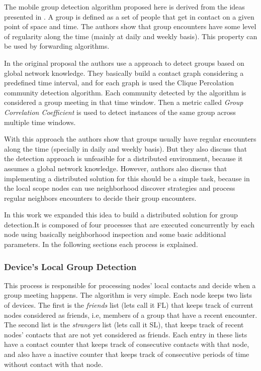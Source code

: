 The mobile group detection algorithm proposed here is derived from the ideas presented in \cite{groupMobility}.
A group is defined as a set of people that get in contact on a given point of space and time. The authors show that
group encounters have some level of regularity along the time (mainly at daily and weekly basis). This property can be used by forwarding algorithms.

In the original proposal the authors use a approach to detect groups based on global network knowledge. They basically
build a contact graph considering a predefined time interval, and for each graph is used the Clique Percolation community
detection algorithm. Each community detected by the algorithm is considered a group meeting in that time window. Then
a metric called \textit{Group Correlation Coefficient} is used to detect instances of the same group across multiple time
windows.

With this approach the authors show that groups usually have regular encounters along the time (specially in daily and weekly basis).
But they also discuss that the detection approach is unfeasible for a distributed environment, because it assumes a global network
knowledge. However, authors also discuss that implementing a distributed solution for this should be a simple task, because in the local
scope nodes can use neighborhood discover strategies and process regular neighbors encounters to decide their group encounters.

In this work we expanded this idea to build a distributed solution for group detection.It is composed of four processes
that are executed concurrently by each node using basically neighborhood inspection and some basic additional parameters. In the following sections each process is explained.

\subsubsection{Device's Local Group Detection}

This process is responsible for processing nodes' local contacts and decide when a group meeting happens.
The algorithm is very simple. Each node keeps two lists of devices. The first is the \textit{friends} list (lets call it FL)
that keeps track of current nodes considered as friends, i.e, members of a group that have a recent encounter.
The second list is the \textit{strangers} list (lets call it SL), that keeps track of recent nodes' contacts that are not yet
considered as friends. Each entry in these lists have a contact counter that keeps track of consecutive
contacts with that node, and also have a inactive counter that keeps track of consecutive periods of time
without contact with that node.

